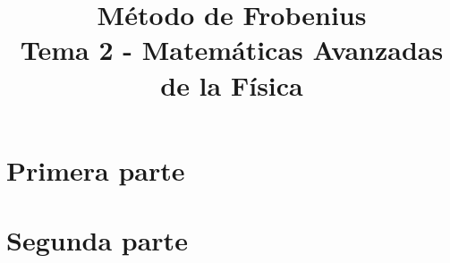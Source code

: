 
\usepackage{subfiles}
\title{Método de Frobenius \\ \large {Tema 2 - Matemáticas Avanzadas de la Física}}
\date{ }

\renewcommand\labelenumii{\theenumi.{\arabic{enumii}}}
\maketitle
\fontsize{14}{14}\selectfont
\part{Primera parte}

\part{Segunda parte}


